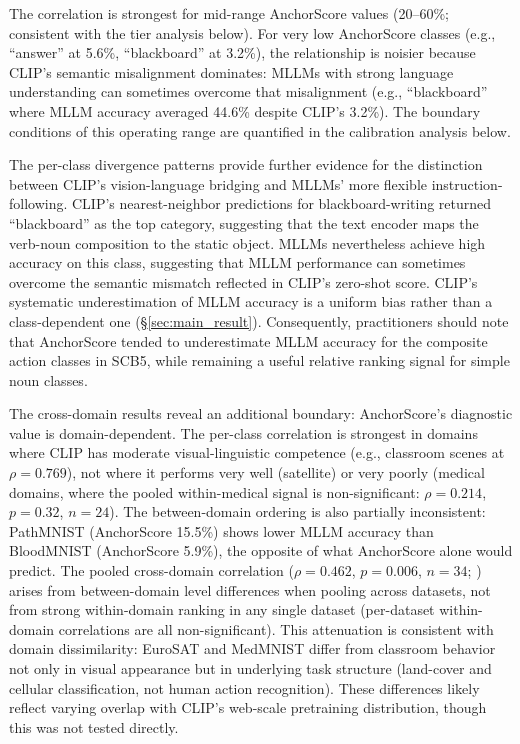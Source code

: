 \documentclass[11pt,a4paper]{article}
\begin{document}
The correlation is strongest for mid-range AnchorScore values (20--60\%; consistent with the tier analysis below). For very low AnchorScore classes (e.g., ``answer'' at 5.6\%, ``blackboard'' at 3.2\%), the relationship is noisier because CLIP's semantic misalignment dominates: MLLMs with strong language understanding can sometimes overcome that misalignment (e.g., ``blackboard'' where MLLM accuracy averaged 44.6\% despite CLIP's 3.2\%). The boundary conditions of this operating range are quantified in the calibration analysis below.

The per-class divergence patterns provide further evidence for the distinction between CLIP's vision-language bridging and MLLMs' more flexible instruction-following. CLIP's nearest-neighbor predictions for blackboard-writing returned ``blackboard'' as the top category, suggesting that the text encoder maps the verb-noun composition to the static object. MLLMs nevertheless achieve high accuracy on this class, suggesting that MLLM performance can sometimes overcome the semantic mismatch reflected in CLIP's zero-shot score. CLIP's systematic underestimation of MLLM accuracy is a uniform bias rather than a class-dependent one (\S\ref{sec:main_result}). Consequently, practitioners should note that AnchorScore tended to underestimate MLLM accuracy for the composite action classes in SCB5, while remaining a useful relative ranking signal for simple noun classes.

The cross-domain results reveal an additional boundary: AnchorScore's diagnostic value is domain-dependent. The per-class correlation is strongest in domains where CLIP has moderate visual-linguistic competence (e.g., classroom scenes at $\rho=0.769$), not where it performs very well (satellite) or very poorly (medical domains, where the pooled within-medical signal is non-significant: $\rho=0.214$, $p=0.32$, $n=24$). The between-domain ordering is also partially inconsistent: PathMNIST (AnchorScore 15.5\%) shows lower MLLM accuracy than BloodMNIST (AnchorScore 5.9\%), the opposite of what AnchorScore alone would predict. The pooled cross-domain correlation ($\rho=0.462$, $p=0.006$, $n=34$; ) arises from between-domain level differences when pooling across datasets, not from strong within-domain ranking in any single dataset (per-dataset within-domain correlations are all non-significant). This attenuation is consistent with domain dissimilarity: EuroSAT and MedMNIST differ from classroom behavior not only in visual appearance but in underlying task structure (land-cover and cellular classification, not human action recognition). These differences likely reflect varying overlap with CLIP's web-scale pretraining distribution, though this was not tested directly.
\end{document}
